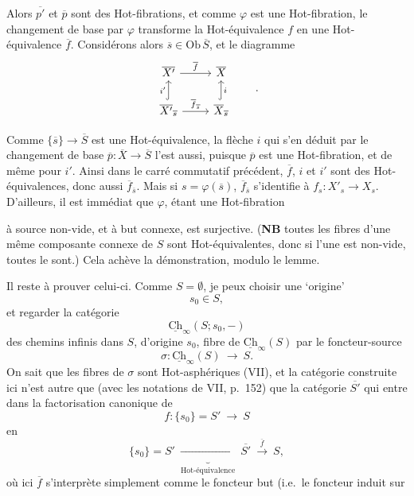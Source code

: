 \documentclass[11pt]{article}
\newcommand{\printedpage}[1]{\marginpar{\footnotesize p.~#1}}
\newcommand{\msp}[1]{\marginpar{\footnotesize [#1]}}
\newcommand{\Ch}{\underline{\mathrm{Ch}}}
\newcommand{\Ob}{\mathrm{Ob}\,}
\begin{document}
Alors $\overline{p'}$ et $\overline{p}$ sont des Hot-fibrations, et comme $\varphi$ est une Hot-fibration, le changement de base par $\varphi$ transforme la Hot-équivalence $f$ en une Hot-équivalence $\overline{f}$. Considérons alors $\overline{s} \in \Ob\overline{S}$, et le diagramme
\[
\begin{tikzcd}
\overline{X'} \arrow[r, "\overline{f}"] & \overline{X} \\
\overline{X'}_{\overline{s}} \arrow[u, hook, "i'"] \arrow[r, "\overline{f}_{\overline{s}}"] & \overline{X}_{\overline{s}} \arrow[u, hook, "i"']
\end{tikzcd}
\qquad .
\]

\printedpage{6}

Comme $\{\overline{s}\} \longrightarrow \overline{S}$ est une Hot-équivalence, la flèche $i$ qui s'en déduit par le changement de base $\overline{p} : \overline{X} \longrightarrow \overline{S}$ l'est aussi, puisque $\overline{p}$ est une Hot-fibration, et de même pour $i'$. Ainsi dans le carré commutatif précédent, $\overline{f}$, $i$ et $i'$ sont des Hot-équivalences, donc aussi $\overline{f}_{\overline{s}}$. Mais si $s = \varphi(\overline{s})$, $\overline{f}_{\overline{s}}$ s'identifie à $f_s : X'_s \longrightarrow X_s$. D'ailleurs, il est immédiat que $\varphi$, étant une Hot-fibration

\msp{page 135}

à source non-vide, et à but connexe, est surjective. (\textbf{NB} toutes les fibres d'une même composante connexe de $S$ sont Hot-équivalentes, donc si l'une est non-vide, toutes le sont.) Cela achève la démonstration, modulo le lemme.

Il reste à prouver celui-ci. Comme $S = \emptyset$, je peux choisir une ‘origine’
\[
s_0 \in S,
\]
et regarder la catégorie
\[
\Ch_{\infty}(S; s_0, -)
\]
des chemins infinis dans $S$, d'origine $s_0$, fibre de $\Ch_{\infty}(S)$ par le foncteur-source
\[
\sigma : \Ch_{\infty}(S) \ \longrightarrow\ S.
\]
On sait que les fibres de $\sigma$ sont Hot-asphériques (VII), et la catégorie construite ici n'est autre que (avec les notations de VII, p.~152) que la catégorie $\overline{S'}$ qui entre dans la factorisation canonique de
\[
f : \{s_0\} = S' \ \longrightarrow\ S
\]
en
\[
\{s_0\} = S' \ \underbrace{\longrightarrow}_{\text{Hot-équivalence}}\ \overline{S'} \ \xrightarrow{\ \overline{f}\ }\ S,
\]
où ici $\overline{f}$ s'interprète simplement comme le foncteur but (i.e.\ le foncteur induit sur

\msp{page 136}
\end{document}
